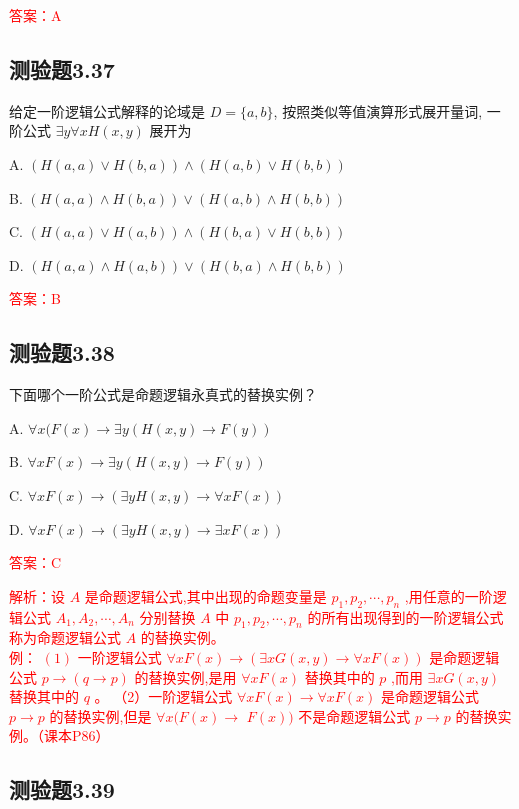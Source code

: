 \documentclass[UTF8, heading=true]{ctexart}
\begin{document}
\textcolor{red}{答案：A}

\subsection{测验题3.37}

给定一阶逻辑公式解释的论域是 $D=\{a, b\}$, 按照类似等值演算形式展开量词, 一阶公式 $\exists y \forall x H(x, y)$ 展开为 $\qquad$

A. $(H(a, a) \vee H(b, a)) \wedge(H(a, b) \vee H(b, b))$

B. $(H(a, a) \wedge H(b, a)) \vee(H(a, b) \wedge H(b, b))$

C. $(H(a, a) \vee H(a, b)) \wedge(H(b, a) \vee H(b, b))$

D. $(H(a, a) \wedge H(a, b)) \vee(H(b, a) \wedge H(b, b))$

\textcolor{red}{答案：B}


\subsection{测验题3.38}

下面哪个一阶公式是命题逻辑永真式的替换实例？

A. $\forall x(F(x) \rightarrow \exists y(H(x, y) \rightarrow F(y))$

B. $\forall x F(x) \rightarrow \exists y(H(x, y) \rightarrow F(y))$

C. $\forall x F(x) \rightarrow(\exists y H(x, y) \rightarrow \forall x F(x))$

D. $\forall x F(x) \rightarrow(\exists y H(x, y) \rightarrow \exists x F(x))$

\textcolor{red}{答案：C}

\textcolor{red}{解析：设 $A$ 是命题逻辑公式,其中出现的命题变量是 $p_1, p_2, \cdots, p_n$ ,用任意的一阶逻辑公式 $A_1, A_2, \cdots, A_n$ 分别替换 $A$ 中 $p_1, p_2, \cdots, p_n$ 的所有出现得到的一阶逻辑公式称为命题逻辑公式 $A$ 的替换实例。
\\ \indent 例： $(1)$ 一阶逻辑公式 $\forall x F(x) \rightarrow(\exists x G(x, y) \rightarrow \forall x F(x))$ 是命题逻辑公式 $p \rightarrow(q \rightarrow p)$ 的替换实例,是用 $\forall x F(x)$ 替换其中的 $p$ ,而用 $\exists x G(x, y)$ 替换其中的 $q$ 。
（2）一阶逻辑公式 $\forall x F(x) \rightarrow \forall x F(x)$ 是命题逻辑公式 $p \rightarrow p$ 的替换实例,但是 $\forall x(F(x) \rightarrow$ $F(x))$ 不是命题逻辑公式 $p \rightarrow p$ 的替换实例。（课本P86）}
\subsection{测验题3.39}
\end{document}

